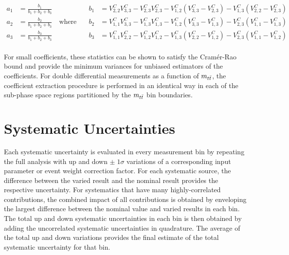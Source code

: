 \begin{refsection}
\begin{linenomath*}
\begin{align*}
  a_1 &= \frac{b_1}{b_1+b_2+b_3} \quad \quad & b_1 &= V^C_{2,2}V^C_{3,3} - V^C_{2,3}V^C_{2,3} - V^C_{1,2}(V^C_{3,3}-V^C_{2,3}) - V^C_{1,3}(V^C_{2,2}-V^C_{2,3}) \\
  a_2 &= \frac{b_2}{b_1+b_2+b_3} \quad \text{where} \quad & b_2 &= V^C_{1,1}V^C_{3,3} - V^C_{1,3}V^C_{1,3} - V^C_{1,2}(V^C_{3,3}-V^C_{1,3}) - V^C_{2,3}(V^C_{1,1}-V^C_{1,3}) \\
  a_3 &= \frac{b_3}{b_1+b_2+b_3} \quad \quad & b_3 &= V^C_{1,1}V^C_{2,2} - V^C_{1,2}V^C_{1,2} - V^C_{1,3}(V^C_{2,2}-V^C_{1,2}) - V^C_{2,3}(V^C_{1,1}-V^C_{1,2}) \\
\end{align*}
\end{linenomath*}
For small coefficients, these statistics can be shown to satisfy the Cramér-Rao bound and provide the minimum variances for unbiased estimators of the coefficients.
For double differential measurements as a function of $m_{t\bar{t}}$, the coefficient extraction procedure is performed in an identical way in each of the sub-phase space regions partitioned by the $m_{t\bar{t}}$ bin boundaries.


\section{Systematic Uncertainties}
\label{Systematic_Uncertainties}
Each systematic uncertainty is evaluated in every measurement bin by repeating the full analysis with up and down $\pm \; 1 \sigma$ variations of a corresponding input parameter or event weight correction factor.
For each systematic source, the difference between the varied result and the nominal result provides the respective uncertainty.
For systematics that have many highly-correlated contributions, the combined impact of all contributions is obtained by enveloping the largest difference between the nominal value and varied results in each bin.
The total up and down systematic uncertainties in each bin is then obtained by adding the uncorrelated systematic uncertainties in quadrature.
The average of the total up and down variations provides the final estimate of the total systematic uncertainty for that bin.


\end{refsection}
